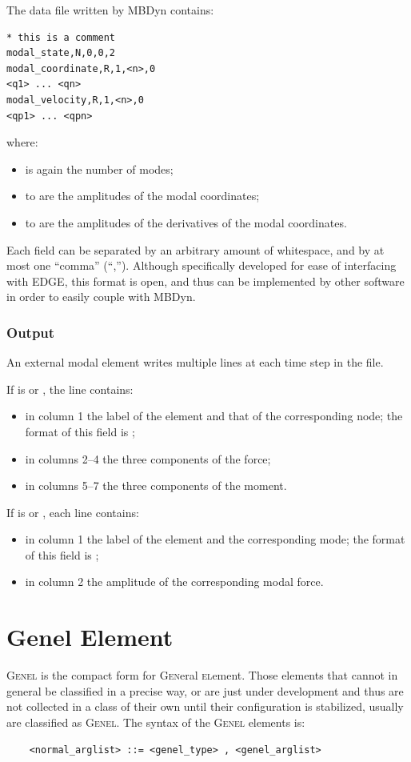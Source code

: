 The data file written by MBDyn contains:
\begin{verbatim}
* this is a comment
modal_state,N,0,0,2
modal_coordinate,R,1,<n>,0
<q1> ... <qn>
modal_velocity,R,1,<n>,0
<qp1> ... <qpn>
\end{verbatim}
where:
\begin{itemize}
\item {} is again the number of modes;
\item {} to  are the amplitudes of the modal coordinates;
\item {} to  are the amplitudes of the derivatives
	of the modal coordinates.
\end{itemize}

Each field can be separated by an arbitrary amount of whitespace,
and by at most one ``comma'' (``,'').
Although specifically developed for ease of interfacing with EDGE,
this format is open, and thus can be implemented by other software
in order to easily couple with MBDyn.


\subsubsection{Output}
An external modal element writes multiple lines at each time step
in the  file.

If  is  or , the line contains:
\begin{itemize}
\item in column 1 the label of the element and that of the corresponding node;
	the format of this field is ;
\item in columns 2--4 the three components of the force;
\item in columns 5--7 the three components of the moment.
\end{itemize}
If  is  or , each line contains:
\begin{itemize}
\item in column 1 the label of the element and the corresponding mode;
	the format of this field is ;
\item in column 2 the amplitude of the corresponding modal force.
\end{itemize}



\section{Genel Element}
\label{sec:EL:GENEL}
\textsc{Genel} is the compact form for \textsc{Gen}eral \textsc{el}ement.
Those elements that cannot in general be classified in a precise way, 
or are just under development and thus are not collected in a class 
of their own until their configuration is stabilized, usually are
classified as \textsc{Genel}.
The syntax of the \textsc{Genel} elements is:
\begin{verbatim}
    <normal_arglist> ::= <genel_type> , <genel_arglist>
\end{verbatim}

